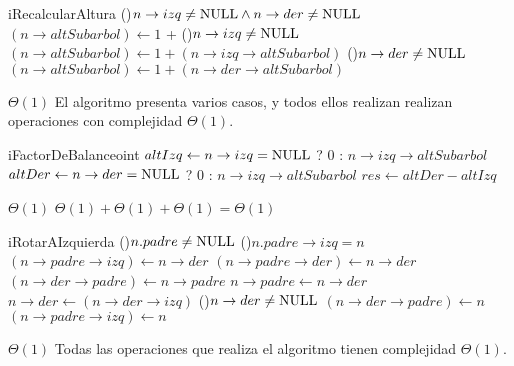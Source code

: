 \begin{Algoritmos}
  \begin{algoritmo}{iRecalcularAltura}{}{}
    \uIf(){$n \to izq \neq \textrm{NULL} \land n \to der \neq \textrm{NULL}$}{
      $(n \to altSubarbol) \gets 1$ +  
    }\uElseIf(){$n \to izq \neq \textrm{NULL}$}{
      $(n \to altSubarbol) \gets 1 + (n \to izq \to altSubarbol)$ 
    }\uElseIf(){$n \to der \neq \textrm{NULL}$}{
      $(n \to altSubarbol) \gets 1 + (n \to der \to altSubarbol)$ 
    }
  \end{algoritmo}
  {} %
  {} %
  {$\Theta(1)$} %
  {El algoritmo presenta varios casos, y todos ellos realizan realizan operaciones con complejidad $\Theta(1)$.} %

  \begin{algoritmo}{iFactorDeBalanceo}{}{int}
     $altIzq \gets n \to izq = \textrm{NULL}$ ? 0 : $n \to izq \to altSubarbol$ 
     $altDer \gets n \to der = \textrm{NULL}$ ? 0 : $n \to izq \to altSubarbol$ 
    $res \gets altDer - altIzq$ 
  \end{algoritmo}
  {} %
  {} %
  {$\Theta(1)$} %
  {$\Theta(1) + \Theta(1) + \Theta(1) = \Theta(1)$} %

  \begin{algoritmo}{iRotarAIzquierda}{}{}
    \If(){$n.padre \neq \textrm{NULL}$}{
      \eIf(){$n.padre \to izq = n$}{
        $(n \to padre \to izq) \gets n \to der$ 
      }{
        $(n \to padre \to der) \gets n \to der$ 
      }
    }
    $(n \to der \to padre) \gets n \to padre$  
    $n \to padre \gets n \to der$ 
    $n \to der \gets (n \to der \to izq)$ 
    \If(){$n \to der \neq \textrm{NULL}$}{
      $(n \to der \to padre) \gets n$ 
    }
    $(n \to padre \to izq) \gets n$ 
     
     
  \end{algoritmo}
  {} %
  {} %
  {$\Theta(1)$} %
  {Todas las operaciones que realiza el algoritmo tienen complejidad $\Theta(1)$.} %


\end{Algoritmos}
